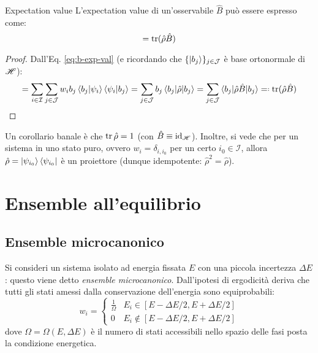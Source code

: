 \begin{theorem}{Expectation value}{}
	L'expectation value di un'osservabile $ \hat{B} $ può essere espresso come:
	\begin{equation}
		[B] = \tr(\hat{\rho} \hat{B})
	\end{equation}

	\tcblower

	\begin{proof}
		Dall'Eq. \ref{eq:b-exp-val} (e ricordando che $ \{\ket{b_j}\}_{j \in \mathcal{J}} $ è base ortonormale di $ \mathscr{H} $):
		\begin{equation*}
			[B] = \sum_{i \in \mathcal{I}} \sum_{j \in \mathcal{J}} w_i b_j \braket{b_j | \psi_i} \braket{\psi_i | b_j} = \sum_{j \in \mathcal{J}} b_j \braket{b_j | \hat{\rho} | b_j} = \sum_{j \in \mathcal{J}} \braket{b_j | \hat{\rho} \hat{B} | b_j} \eqdef \tr(\hat{\rho} \hat{B})
		\end{equation*}
	\end{proof}
\end{theorem}

Un corollario banale è che $ \operatorname{tr}{\hat{\rho}} = 1 $ (con $ \hat{B} \equiv \operatorname{id}_{\mathscr{H}} $). Inoltre, si vede che per un sistema in uno stato puro, ovvero $ w_i = \delta_{i,i_0} $ per un certo $ i_0 \in \mathcal{I} $, allora $ \hat{\rho} = \ket{\psi_{i_0}}\bra{\psi_{i_0}} $ è un proiettore (dunque idempotente: $ \hat{\rho}^2 = \hat{\rho} $).

\section{Ensemble all'equilibrio}

\subsection{Ensemble microcanonico}

Si consideri un sistema isolato ad energia fissata $ E $ con una piccola incertezza $ \Delta E $: questo viene detto \textit{ensemble microcanonico}. Dall'ipotesi di ergodicità deriva che tutti gli stati amessi dalla conservazione dell'energia sono equiprobabili:
\begin{equation}
	w_i =
	\begin{cases}
		\frac{1}{\Omega} & E_i \in [E - \Delta E/2 , E + \Delta E/2] \\
		0 & E_i \notin [E - \Delta E/2 , E + \Delta E/2]
	\end{cases}
	\label{eq:microcanon-ens}
\end{equation}
dove $ \Omega = \Omega(E, \Delta E) $ è il numero di stati accessibili nello spazio delle fasi posta la condizione energetica.

